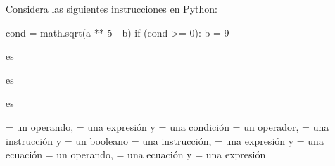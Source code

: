 \newpage

\begin{ejercicio} Considera las siguientes instrucciones en Python:


\begin{python}
cond = math.sqrt(a ** 5 - b)
if (cond >= 0):
    b = 9
\end{python}

  es 

  es 

 es  

\begin{choices}
    \choice {} = un operando,  = una expresión y  = una condición   %
    \choice {} = un operador,  = una instrucción y  = un booleano
    \choice {} = una instrucción,  = una expresión y  = una ecuación 
    \choice {} = un operando,  = una ecuación y  = una expresión
\end{choices}
\end{ejercicio}


